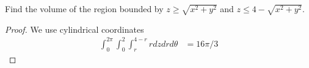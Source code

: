 \documentclass[openany]{book}
\begin{document}
\begin{prob}
    Find the volume of the region bounded by $z\geq\sqrt{x^2+y^2}$ and $z\leq 4-\sqrt{x^2+y^2}$.
\end{prob}
\begin{proof}
    We use cylindrical coordinates
    \begin{align*}
        \int_0^{2\pi}\int_0^2\int_{r}^{4-r}rdzdrd\theta&=16\pi/3
    \end{align*}
\end{proof}
\end{document}
